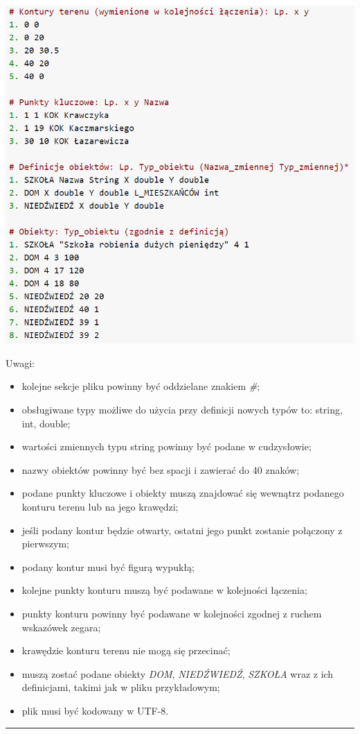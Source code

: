 \documentclass[a4paper,11pt]{article}
\newcommand{\linia}{\rule{\linewidth}{0.4mm}}
\begin{document}
\includegraphics[scale=0.70]{ExampleInputFile}

\noindent
Uwagi:
\begin{itemize}
\item kolejne sekcje pliku powinny być oddzielane znakiem \textit{\#};
\item obsługiwane typy możliwe do użycia przy definicji nowych typów to: string, int, double;
\item wartości zmiennych typu string powinny być podane w cudzysłowie;
\item nazwy obiektów powinny być bez spacji i zawierać do 40 znaków;
\item podane punkty kluczowe i obiekty muszą znajdować się wewnątrz podanego konturu terenu lub na jego krawędzi;
\item jeśli podany kontur będzie otwarty, ostatni jego punkt zostanie połączony z pierwszym;
\item podany kontur musi być figurą wypukłą;
\item kolejne punkty konturu muszą być podawane w kolejności łączenia;
\item punkty konturu powinny być podawane w kolejności zgodnej z ruchem wskazówek zegara;
\item krawędzie konturu terenu nie mogą się przecinać;
\item muszą zostać podane obiekty \textit{DOM}, \textit{NIEDŹWIEDŹ}, \textit{SZKOŁA} wraz z ich definicjami, takimi jak w pliku przykładowym;
\item plik musi być kodowany w UTF-8.
\end{itemize}
\noindent\linia
\end{document}
